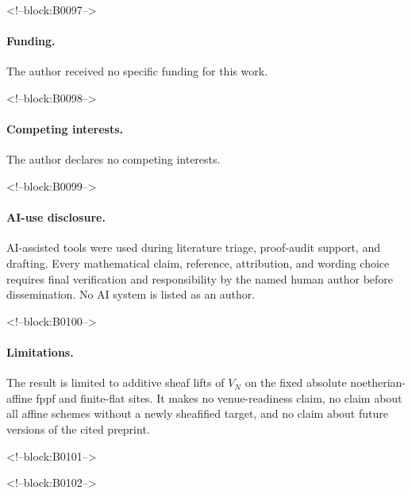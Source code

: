 \documentclass[11pt]{article}
\theoremstyle{definition}
\begin{document}
<!--block:B0097-->
\paragraph{Funding.}
The author received no specific funding for this work.

<!--block:B0098-->
\paragraph{Competing interests.}
The author declares no competing interests.

<!--block:B0099-->
\paragraph{AI-use disclosure.}
AI-assisted tools were used during literature triage, proof-audit support,
and drafting.  Every mathematical claim, reference, attribution, and
wording choice requires final verification and responsibility by the named
human author before dissemination.  No AI system is listed as an author.

<!--block:B0100-->
\paragraph{Limitations.}
The result is limited to additive sheaf lifts of \(V_N\) on the fixed
absolute noetherian-affine fppf and finite-flat sites.  It makes no
venue-readiness claim, no claim about all affine schemes without a newly
sheafified target, and no claim about future versions of the cited
preprint.

<!--block:B0101-->



<!--block:B0102-->
\end{document}
